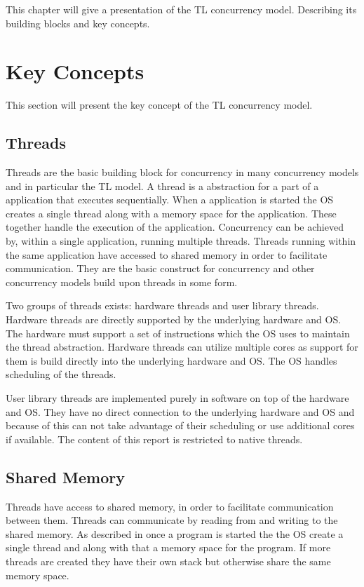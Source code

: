 \makeatletter {}\makeatother
{}
This chapter will give a presentation of the \acl{TL} concurrency model. Describing its building blocks and key concepts. 
\label{chap:threads_locks}
\section{Key Concepts}
This section will present the key concept of the \ac{TL} concurrency model. 
\subsection{Threads}\label{subsec:threads}
Threads are the basic building block for concurrency in many concurrency models and in particular the \ac{TL} model. A thread is a abstraction for a part of a application that executes sequentially. When a application is started the \ac{OS} creates a single thread along with a memory space for the application. These together handle the execution of the application. Concurrency can be achieved by, within a single application, running multiple threads. Threads running within the same application have accessed to shared memory in order to facilitate communication. They are the basic construct for concurrency and other concurrency models build upon threads in some form.

Two groups of threads exists: hardware threads and user library threads. Hardware threads are directly supported by the underlying hardware and \ac{OS}. The hardware must support a set of instructions which the \ac{OS} uses to maintain the thread abstraction. Hardware threads can utilize multiple cores as support for them is build directly into the underlying hardware and \ac{OS}. The \ac{OS} handles scheduling of the threads.

User library threads are implemented purely in software on top of the hardware and \ac{OS}. They have no direct connection to the underlying hardware and \ac{OS} and because of this can not take advantage of their scheduling or use additional cores if available. The content of this report is restricted to native threads.

\subsection{Shared Memory}
Threads have access to shared memory, in order to facilitate communication between them\cite[p. 93]{tanenbaum2008modern}. Threads can communicate by reading from and writing to the shared memory. As described in  once a program is started the the \ac{OS} create a single thread and along with that a memory space for the program. If more threads are created they have their own stack but otherwise share the same memory space.

